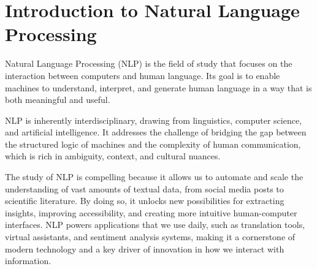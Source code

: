 \chapter{Introduction to Natural Language Processing}

Natural Language Processing (NLP) is the field of study that focuses on the interaction between computers and human language. Its goal is to enable machines to understand, interpret, and generate human language in a way that is both meaningful and useful.

NLP is inherently interdisciplinary, drawing from linguistics, computer science, and artificial intelligence. It addresses the challenge of bridging the gap between the structured logic of machines and the complexity of human communication, which is rich in ambiguity, context, and cultural nuances.

The study of NLP is compelling because it allows us to automate and scale the understanding of vast amounts of textual data, from social media posts to scientific literature. By doing so, it unlocks new possibilities for extracting insights, improving accessibility, and creating more intuitive human-computer interfaces. NLP powers applications that we use daily, such as translation tools, virtual assistants, and sentiment analysis systems, making it a cornerstone of modern technology and a key driver of innovation in how we interact with information.